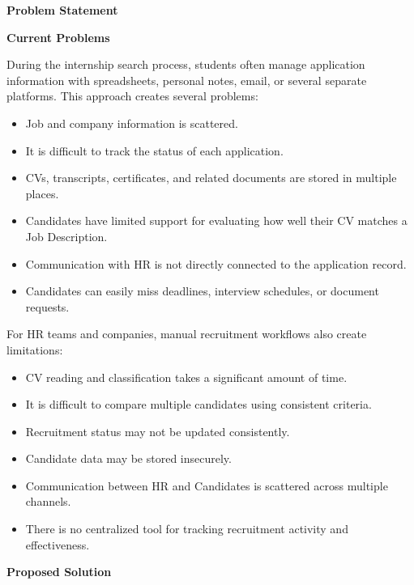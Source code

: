 \vspace{0.5em}\noindent\textbf{Problem Statement}\par

\vspace{0.5em}\noindent\textbf{Current Problems}\par

During the internship search process, students often manage application
information with spreadsheets, personal notes, email, or several
separate platforms. This approach creates several problems:

\begin{itemize}
\tightlist
\item
  Job and company information is scattered.
\item
  It is difficult to track the status of each application.
\item
  CVs, transcripts, certificates, and related documents are stored in
  multiple places.
\item
  Candidates have limited support for evaluating how well their CV
  matches a Job Description.
\item
  Communication with HR is not directly connected to the application
  record.
\item
  Candidates can easily miss deadlines, interview schedules, or document
  requests.
\end{itemize}

For HR teams and companies, manual recruitment workflows also create
limitations:

\begin{itemize}
\tightlist
\item
  CV reading and classification takes a significant amount of time.
\item
  It is difficult to compare multiple candidates using consistent
  criteria.
\item
  Recruitment status may not be updated consistently.
\item
  Candidate data may be stored insecurely.
\item
  Communication between HR and Candidates is scattered across multiple
  channels.
\item
  There is no centralized tool for tracking recruitment activity and
  effectiveness.
\end{itemize}

\vspace{0.5em}\noindent\textbf{Proposed Solution}\par

